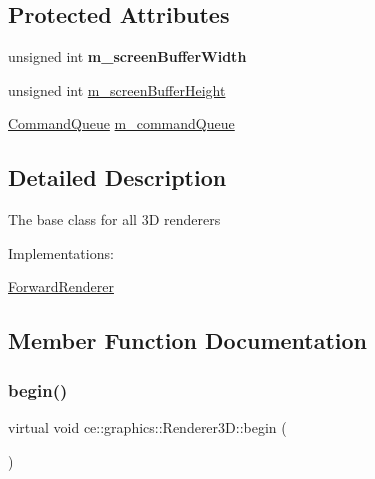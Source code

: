 \subsection*{Protected Attributes}
\begin{DoxyCompactItemize}
\item 
\mbox{\label{classce_1_1graphics_1_1_renderer3_d_ae0794abc076ff68ed7c8eb9fd2bbd278}} 
unsigned int {\bfseries m\+\_\+screen\+Buffer\+Width}
\item 
unsigned int \hyperlink{classce_1_1graphics_1_1_renderer3_d_a03b1b45f98919b5468fce308f19fac57}{m\+\_\+screen\+Buffer\+Height}
\item 
\hyperlink{_renderer3_d_8h_ac74e86a347f4c5c97dd6ad781c329874}{Command\+Queue} \hyperlink{classce_1_1graphics_1_1_renderer3_d_a495b3dd349daf3e7f7b7b0cc0de8d950}{m\+\_\+command\+Queue}
\end{DoxyCompactItemize}


\subsection{Detailed Description}
The base class for all 3D renderers

Implementations\+:
\begin{DoxyItemize}
\item \hyperlink{classce_1_1graphics_1_1_forward_renderer}{Forward\+Renderer} 
\end{DoxyItemize}

\subsection{Member Function Documentation}
\mbox{\label{classce_1_1graphics_1_1_renderer3_d_a51818b5b581c33001ddbbc6dff9d6e36}} 
\subsubsection{\texorpdfstring{begin()}{begin()}}
{\footnotesize\ttfamily virtual void ce\+::graphics\+::\+Renderer3\+D\+::begin (\begin{DoxyParamCaption}{ }\end{DoxyParamCaption})\hspace{0.3cm}{\ttfamily [pure virtual]}}

